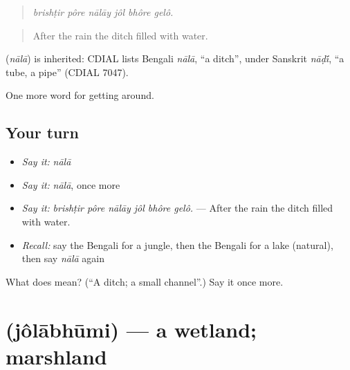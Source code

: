 \begin{quote}
     
\end{quote}

\begin{quote}
\emph{brishṭir pôre nālāy jôl bhôre gelô.}
\end{quote}

\begin{quote}
After the rain the ditch filled with water.
\end{quote}

\begin{cousinweb}
\textbf{} (\emph{nālā}) is inherited: CDIAL lists Bengali \emph{nālā}, \textquotedblleft{}a ditch\textquotedblright{}, under Sanskrit \emph{nāḍ\'{\={\i}}}, \textquotedblleft{}a tube, a pipe\textquotedblright{} (CDIAL 7047).
\end{cousinweb}

\begin{grammarlens}[title={What you've built}]
One more word for getting around.
\end{grammarlens}

\subsection*{Your turn}
\begin{itemize}
\raggedright
  \item \emph{Say it:} \emph{nālā}
  \item \emph{Say it:} \emph{nālā}, once more
  \item \emph{Say it:} \emph{brishṭir pôre nālāy jôl bhôre gelô.} — After the rain the ditch filled with water.
  \item \emph{Recall:} say the Bengali for a jungle, then the Bengali for a lake (natural), then say \emph{nālā} again
\end{itemize}

\begin{tcolorbox}[breakable,colback=teal!4,colframe=teal!35!black,title={Before you move on}]
What does  mean? (\textquotedblleft{}A ditch; a small channel\textquotedblright{}.) Say it once more.
\end{tcolorbox}
\section[\texorpdfstring{\bn{জলাভূমি} (jôlābhūmi)}{জলাভূমি (jôlābhūmi)}]{ (jôlābhūmi) — a wetland; marshland}

